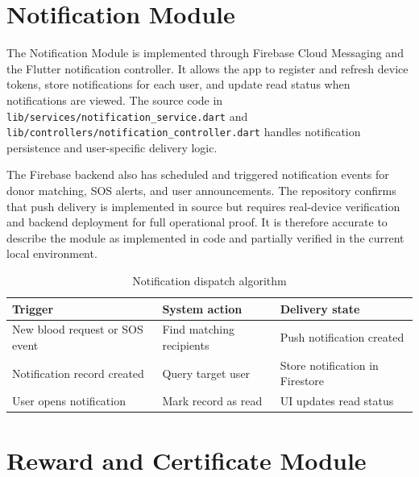 
\section{Notification Module}

The Notification Module is implemented through Firebase Cloud Messaging and the Flutter notification controller. It allows the app to register and refresh device tokens, store notifications for each user, and update read status when notifications are viewed. The source code in \texttt{lib/services/notification_service.dart} and \texttt{lib/controllers/notification_controller.dart} handles notification persistence and user-specific delivery logic.

The Firebase backend also has scheduled and triggered notification events for donor matching, SOS alerts, and user announcements. The repository confirms that push delivery is implemented in source but requires real-device verification and backend deployment for full operational proof. It is therefore accurate to describe the module as implemented in code and partially verified in the current local environment.

\begin{table}[H]
\centering
\caption{Notification dispatch algorithm}
\begin{tabularx}{\textwidth}{|p{4.2cm}|X|p{4.0cm}|}
\hline
\textbf{Trigger} & \textbf{System action} & \textbf{Delivery state} \\
\hline
New blood request or SOS event & Find matching recipients & Push notification created \\
\hline
Notification record created & Query target user & Store notification in Firestore \\
\hline
User opens notification & Mark record as read & UI updates read status \\
\hline
\end{tabularx}
\end{table}


\section{Reward and Certificate Module}

